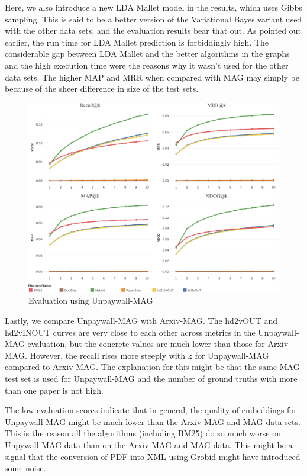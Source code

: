 Here, we also introduce a new LDA Mallet model in the results, which uses Gibbs sampling. This is said to be a better version of the Variational Bayes variant used with the other data sets, and the evaluation results bear that out. As pointed out earlier, the run time for LDA Mallet prediction is forbiddingly high. The considerable gap between LDA Mallet and the better algorithms in the graphs and the high execution time were the reasons why it wasn't used for the other data sets. 
The higher MAP and MRR when compared with MAG may simply be because of the sheer difference in size of the test sets.
\begin{figure}
    \centering
    \includegraphics[keepaspectratio, width=.9\linewidth]{figures/Evaluation/UnpaywallMetricsGraph.pdf}
    \caption{Evaluation using Unpaywall-MAG}
    \label{fig:unpaywallmagevaluation}
\end{figure}
Lastly, we compare Unpaywall-MAG with Arxiv-MAG. The hd2vOUT and hd2vINOUT curves are very close to each other across metrics in the Unpaywall-MAG evaluation, but the concrete values are much lower than those for Arxiv-MAG. However, the recall rises more steeply with k for Unpaywall-MAG compared to Arxiv-MAG. The explanation for this might be that the same MAG test set is used for Unpaywall-MAG and the number of ground truths with more than one paper is not high. 

The low evaluation scores indicate that in general, the quality of embeddings for Unpaywall-MAG might be much lower than the Arxiv-MAG and MAG data sets. This is the reason all the algorithms (including BM25) do so much worse on Unpywall-MAG data than on the Arxiv-MAG and MAG data. This might be a signal that the conversion of PDF into XML using Grobid might have introduced some noise.  

